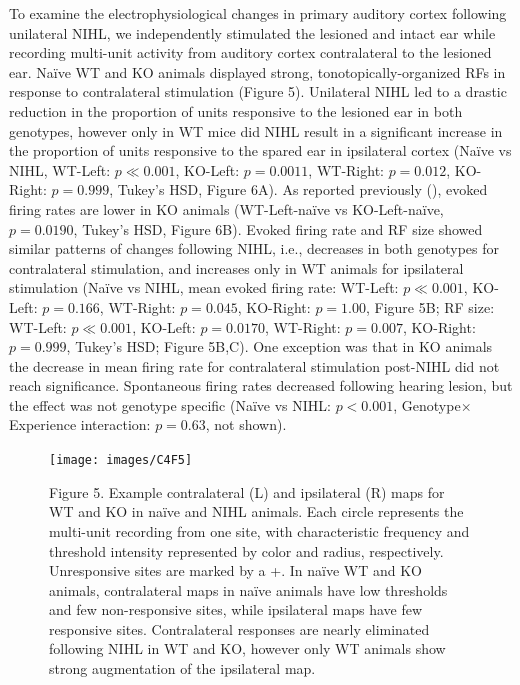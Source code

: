 To examine the electrophysiological changes in primary auditory cortex following unilateral NIHL, we independently stimulated the lesioned and intact ear while recording multi-unit activity from auditory cortex contralateral to the lesioned ear. Na\"ive WT and KO animals displayed strong, tonotopically-organized RFs in response to contralateral stimulation (Figure 5). Unilateral NIHL led to a drastic reduction in the proportion of units responsive to the lesioned ear in both genotypes, however only in WT mice did NIHL result in a significant increase in the proportion of units responsive to the spared ear in ipsilateral cortex (Na\"ive vs NIHL, WT-Left: $p\ll0.001$, KO-Left: $p=0.0011$, WT-Right: $p=0.012$, KO-Right: $p=0.999$, Tukey's HSD, Figure 6A). As reported previously (\cite{Yang2013}), evoked firing rates are lower in KO animals (WT-Left-na\"ive vs KO-Left-na\"ive, $p=0.0190$, Tukey's HSD, Figure 6B). Evoked firing rate and RF size showed similar patterns of changes following NIHL, i.e., decreases in both genotypes for contralateral stimulation, and increases only in WT animals for ipsilateral stimulation (Na\"ive vs NIHL, mean evoked firing rate: WT-Left: $p\ll0.001$, KO-Left: $p=0.166$, WT-Right: $p=0.045$, KO-Right: $p=1.00$, Figure 5B; RF size: WT-Left: $p\ll0.001$, KO-Left: $p=0.0170$, WT-Right: $p=0.007$, KO-Right: $p=0.999$, Tukey's HSD; Figure 5B,C). One exception was that in KO animals the decrease in mean firing rate for contralateral stimulation post-NIHL did not reach significance. Spontaneous firing rates decreased following hearing lesion, but the effect was not genotype specific (Na\"ive vs NIHL: $p<0.001$, Genotype$\times$Experience interaction: $p=0.63$, not shown).

\begin{figure}
	\centering
		\texttt{[image: images/C4F5]}
	\begin{changemargin}{1in}{1in}
	\footnotesize{Figure 5. Example contralateral (L) and ipsilateral (R) maps for WT and KO in na\"ive and NIHL animals. Each circle represents the multi-unit recording from one site, with characteristic frequency and threshold intensity represented by color and radius, respectively. Unresponsive sites are marked by a +. In na\"ive WT and KO animals, contralateral maps in na\"ive animals have low thresholds and few non-responsive sites, while ipsilateral maps have few responsive sites. Contralateral responses are nearly eliminated following NIHL in WT and KO, however only WT animals show strong augmentation of the ipsilateral map.}
	\end{changemargin}
\end{figure}



